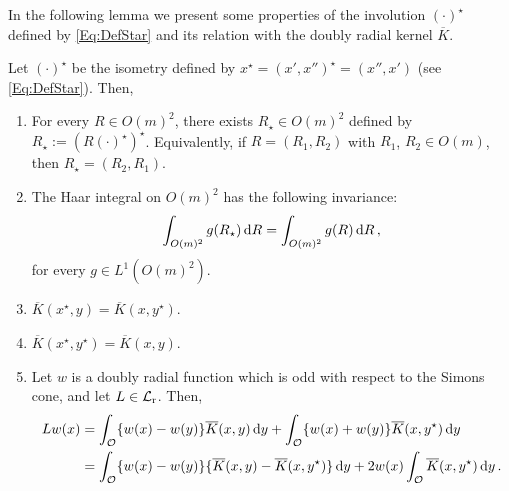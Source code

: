In the following lemma we present some properties of the involution $(\cdot)^\star$ defined by \eqref{Eq:DefStar} and its relation with the doubly radial kernel $\overline{K}$.

\begin{lemma}
\label{Lemma:PropertiesStar}
Let $(\cdot)^\star$ be the isometry defined by $x^\star = (x',x'')^\star = (x'', x')$
(see \eqref{Eq:DefStar}).
Then,
\begin{enumerate}
\item 	
For every $R\in O(m)^2$, there exists  $R_\star\in O(m)^2$ defined by $R_\star :=
(R(\cdot)^\star)^\star$. Equivalently, if $R = (R_1, R_2)$ with $R_1$, $R_2 \in O(m)$, then
$R_\star = (R_2, R_1)$.
\item
The Haar integral on $O(m)^2$ has the following invariance:
\begin{equation}
\label{Eq:InvarianceByStar}
\int_{O(m)^2} g(R_\star) \,\mathrm{d} R = \int_{O(m)^2} g(R) \,\mathrm{d} R \,,
\end{equation}
for every $g \in L^1(O(m)^2)$.
\item $\overline{K}(x^\star,y) = \overline{K} (x,y^\star)$.
\item $\overline{K}(x^\star,y^\star) = \overline{K} (x,y)$.
\item Let $w$ is a doubly radial function which is odd with respect to the Simons cone, and let $L\in \mathcal{L}_{\mathrm{r}}$. Then,
\begin{align*}
Lw (x) &= \int_{\mathcal{O}} \{w(x) - w(y) \} \overline{K}(x, y) \,\mathrm{d} y +  \int_{\mathcal{O}} \{w(x) + w(y) \} \overline{K}(x, y^\star) \,\mathrm{d} y \\
&= \int_{\mathcal{O}} \{w(x) - w(y) \} \{\overline{K}(x, y) - \overline{K}(x, y^\star)  \} \,\mathrm{d} y +  2 w(x) \int_{\mathcal{O}} \overline{K}(x, y^\star) \,\mathrm{d} y \,.
\end{align*}
\end{enumerate}
\end{lemma}

